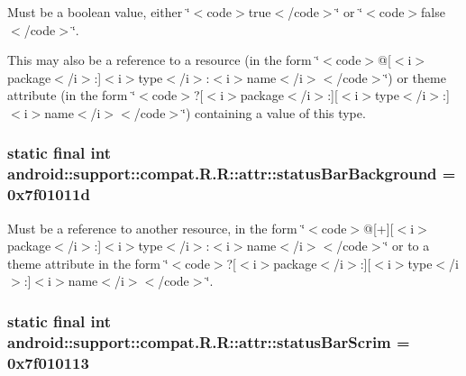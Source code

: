 Must be a boolean value, either \char`\"{}$<$code$>$true$<$/code$>$\char`\"{} or \char`\"{}$<$code$>$false$<$/code$>$\char`\"{}. 

This may also be a reference to a resource (in the form \char`\"{}$<$code$>$@\mbox{[}$<$i$>$package$<$/i$>$:\mbox{]}$<$i$>$type$<$/i$>$:$<$i$>$name$<$/i$>$$<$/code$>$\char`\"{}) or theme attribute (in the form \char`\"{}$<$code$>$?\mbox{[}$<$i$>$package$<$/i$>$:\mbox{]}\mbox{[}$<$i$>$type$<$/i$>$:\mbox{]}$<$i$>$name$<$/i$>$$<$/code$>$\char`\"{}) containing a value of this type. \hypertarget{classandroid_1_1support_1_1compat_1_1_r_1_1attr_0d8fc58b02d7a824f4599b027bd9a855}{
\subsubsection[{statusBarBackground}]{\setlength{\rightskip}{0pt plus 5cm}static final int android::support::compat.R.R::attr::statusBarBackground = 0x7f01011d}}
\label{classandroid_1_1support_1_1compat_1_1_r_1_1attr_0d8fc58b02d7a824f4599b027bd9a855}


Must be a reference to another resource, in the form \char`\"{}$<$code$>$@\mbox{[}+\mbox{]}\mbox{[}$<$i$>$package$<$/i$>$:\mbox{]}$<$i$>$type$<$/i$>$:$<$i$>$name$<$/i$>$$<$/code$>$\char`\"{} or to a theme attribute in the form \char`\"{}$<$code$>$?\mbox{[}$<$i$>$package$<$/i$>$:\mbox{]}\mbox{[}$<$i$>$type$<$/i$>$:\mbox{]}$<$i$>$name$<$/i$>$$<$/code$>$\char`\"{}. \hypertarget{classandroid_1_1support_1_1compat_1_1_r_1_1attr_0f2908e695fe968e887ff1086d9e61cb}{
\subsubsection[{statusBarScrim}]{\setlength{\rightskip}{0pt plus 5cm}static final int android::support::compat.R.R::attr::statusBarScrim = 0x7f010113}}
\label{classandroid_1_1support_1_1compat_1_1_r_1_1attr_0f2908e695fe968e887ff1086d9e61cb}


